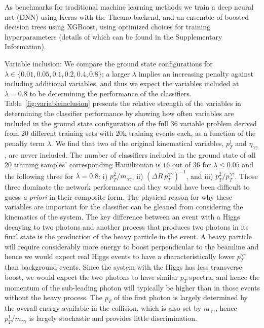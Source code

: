 \documentclass[fleqn,10pt]{wlscirep}
\begin{document}
As benchmarks for traditional machine learning methods we train a deep neural net (DNN) using Keras\cite{keras} with the Theano backend,\cite{2016arXiv160502688full} and  an ensemble of boosted decision trees using XGBoost\cite{xgboost}, using optimized choices for training hyperparameters (details of which can be found in the Supplementary Information). 


{Variable inclusion}:
We compare  the ground state configurations for $\lambda\in\{0.01,0.05,0.1,0.2,0.4,0.8\}$; a larger $\lambda$ implies an increasing penalty against including additional variables, and thus we expect the variables included at $\lambda=0.8$ to be determining the performance of the classifiers. Table~\ref{fig:variableinclusion} presents the relative strength of the variables in determining the classifier performance by showing how often variables are included in the ground state configuration of the full $36$ variable problem derived from $20$ different training sets with $20$k training events each, as a function of the penalty term $\lambda$.   We find that two of the original kinematical variables, $p_T^1$ and $\eta_{\gamma\gamma}$, are never included.  The number of classifiers included in the ground state of all $20$ training samples' corresponding Hamiltonian is $16$ out of $36$ for $\lambda\leq 0.05$ and the following three for $\lambda=0.8$: i) $p_T^2/m_{\gamma\gamma}$, ii) $(\Delta R\, p_T^{\gamma\gamma})^{-1}$, and iii) $p_T^2/p_T^{\gamma\gamma}$. Those three dominate the network performance and they would have been difficult to guess \textit{a priori} in their composite form.  The physical reason for why these variables are important for the classifier can be gleaned from considering the kinematics of the system.  The key difference between an event with a Higgs decaying to two photons and another process that produces two photons in its final state is the production of the heavy particle in the event.  A heavy particle will require considerably more energy to boost perpendicular to the beamline and hence we would expect real Higgs events to have a characteristically lower $p_{T}^{\gamma\gamma}$ than background events.  Since the system with the Higgs has less transverse boost, we would expect the two photons to have similar $p_T$ spectra, and hence the momentum of the sub-leading photon will typically be higher than in those events without the heavy process.  The $p_T$ of the first photon is largely determined by the overall energy available in the collision, which is also set by $m_{\gamma\gamma}$, hence $p_T^1/m_{\gamma\gamma}$ is largely stochastic and provides little discrimination.
\end{document}
